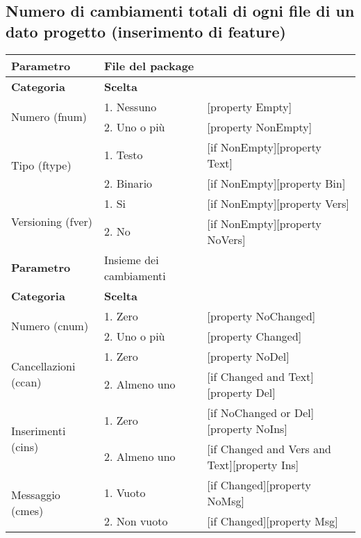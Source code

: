 \subsection{Numero di cambiamenti totali di ogni file di un dato progetto (inserimento di feature)}
		
\begin{tabular}{|p{4cm}|p{4cm}p{5cm}|}
	\hline
	\cellcolor{Gray} \textbf{Parametro}		& File del package	&											\tabularnewline
	\hline
	\rowcolor{Gray}
	\textbf{Categoria} 						& \textbf{Scelta}			&									\tabularnewline
	\hline
	\multirow{2}{*}{Numero (fnum)} 			& 1. Nessuno				&	[property Empty] 				\tabularnewline
	\cline{2-3}
											& 2. Uno o più				&	[property NonEmpty]				\tabularnewline
	\hline
	\multirow{2}{*}{Tipo (ftype)} 			& 1. Testo					&	[if NonEmpty][property Text] 	\tabularnewline
	\cline{2-3}
											& 2. Binario				&	[if NonEmpty][property Bin]		\tabularnewline
	\hline
	\multirow{2}{*}{Versioning (fver)}		& 1. Si						&	[if NonEmpty][property Vers]	\tabularnewline
	\cline{2-3}
											& 2. No						&	[if NonEmpty][property NoVers]	\tabularnewline
	\hline
	
	
	\cellcolor{Gray} \textbf{Parametro}		& Insieme dei cambiamenti	&									\tabularnewline
	\hline
	\rowcolor{Gray}
	\textbf{Categoria} 						& \textbf{Scelta}			&									\tabularnewline
	\hline
	\multirow{2}{*}{Numero (cnum)} 			& 1. Zero 					&	[property NoChanged]			\tabularnewline
	\cline{2-3}
											& 2. Uno o più				&	[property Changed]				\tabularnewline
	\hline
	\multirow{2}{*}{Cancellazioni (ccan)} 	& 1. Zero	 				&	[property NoDel] 				\tabularnewline
	\cline{2-3}
											& 2. Almeno uno				&	[if Changed and Text][property Del]		\tabularnewline
	\hline
	\multirow{2}{*}{Inserimenti (cins)} 	& 1. Zero 					&	[if NoChanged or Del][property NoIns] 				\tabularnewline
	\cline{2-3}
											& 2. Almeno uno 			&	[if Changed and Vers and Text][property Ins]		\tabularnewline
	\hline
	\multirow{2}{*}{Messaggio (cmes)} 		& 1. Vuoto 					&	[if Changed][property NoMsg] 	\tabularnewline
	\cline{2-3}
											& 2. Non vuoto 				&	[if Changed][property Msg]		\tabularnewline
	\hline			
	
\end{tabular}

\vspace{1cm}

